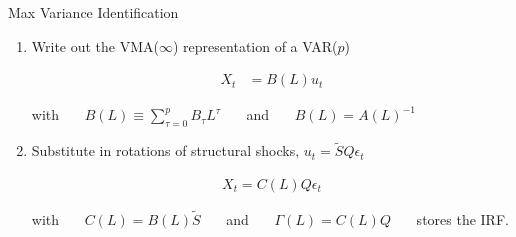   
  \begin{frame}{Max Variance Identification}
  
    \begin{enumerate}
      \item Write out the VMA($\infty$) representation of a VAR($p$)
    
      \vspace{-1cm}
      \begin{align*}
        X_t &= B(L) u_t
      \end{align*}
      \vspace{-1cm}
    
      with \ \ \ $B(L) \equiv \sum_{\tau = 0}^{p} B_\tau L^\tau$ \ \ \ and \ \ \ $B(L) = A(L)^{-1}$
    
      \item Substitute in rotations of structural shocks, $u_t = \tilde{S}Q\epsilon_t$
      
      \vspace{-1cm}
      \begin{align*}
        X_t = C(L) Q \epsilon_t
      \end{align*}
      \vspace{-1cm}
    
      with \ \ \ $C(L) = B(L)\tilde{S}$ \ \ \ and \ \ \ $\Gamma(L) = C(L) Q$  \ \ \ stores the IRF.
    
      
    \end{enumerate}
    
    \end{frame}
  
